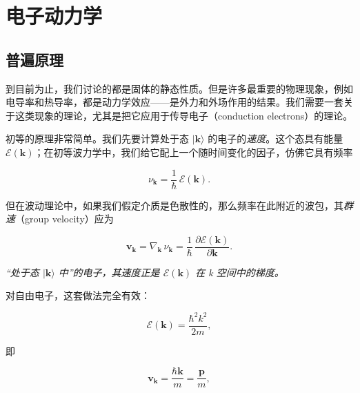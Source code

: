

\chapter{电子动力学}


\section{普遍原理}

到目前为止，我们讨论的都是固体的静态性质。但是许多最重要的物理现象，例如电导率和热导率，都是动力学效应——是外力和外场作用的结果。我们需要一套关于这类现象的理论，尤其是把它应用于传导电子（conduction electrons）的理论。

初等的原理非常简单。我们先要计算处于态 $|\mathbf{k}\rangle$ 的电子的\emph{速度}。这个态具有能量 $\mathcal{E}(\mathbf{k})$；在初等波力学中，我们给它配上一个随时间变化的因子，仿佛它具有频率

\begin{equation*}
\nu_{\mathbf{k}} = \frac{1}{\hbar}\,\mathcal{E}(\mathbf{k}).
\tag{6.1}
\end{equation*}

但在波动理论中，如果我们假定介质是色散性的，那么频率在此附近的波包，其\emph{群速}（group velocity）应为

\begin{equation*}
\mathbf{v}_{\mathbf{k}} = \nabla_{\mathbf{k}}\,\nu_{\mathbf{k}} = \frac{1}{\hbar}\,\frac{\partial\mathcal{E}(\mathbf{k})}{\partial\mathbf{k}}.
\tag{6.2}
\end{equation*}

\emph{“处于态 $|\mathbf{k}\rangle$ 中”的电子，其速度正是 $\mathcal{E}(\mathbf{k})$ 在 k 空间中的梯度。}

对自由电子，这套做法完全有效：

\begin{equation*}
\mathcal{E}(\mathbf{k}) = \frac{\hbar^2 k^2}{2m},
\tag{6.3}
\end{equation*}

即

\begin{equation*}
\mathbf{v}_{\mathbf{k}} = \frac{\hbar\mathbf{k}}{m} = \frac{\mathbf{p}}{m},
\tag{6.4}
\end{equation*}

